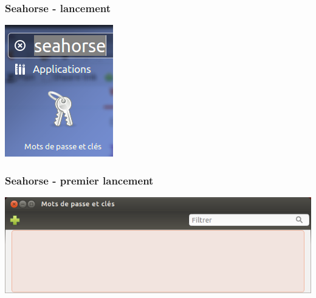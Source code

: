 \documentclass{beamer}
\begin{document}
\begin{frame}
\frametitle{Seahorse - lancement}
\begin{center}
\includegraphics[scale=0.4] {./images/Seahorse00_LancementSeahorse.png}
\end{center}
\begin{itemize}
\end{itemize}
\end{frame}

\begin{frame}
\frametitle{Seahorse - premier lancement}
\begin{center}
\includegraphics[scale=0.4] {./images/Seahorse01_creationclef.png}
\end{center}
\begin{itemize}
\end{itemize}
\end{frame}
\end{document}

